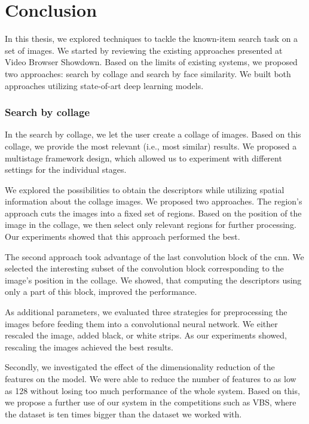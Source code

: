 \chapter*{Conclusion}

In this thesis, we explored techniques to tackle the known-item search task on a set of images. We started by reviewing the existing approaches presented at Video Browser Showdown. Based on the limits of existing systems, we proposed two approaches: search by collage and search by face similarity. We built both approaches utilizing state-of-art deep learning models. 

\subsection*{Search by collage}

In the search by collage, we let the user create a collage of images. Based on this collage, we provide the most relevant (i.e., most similar) results. We proposed a multistage framework design, which allowed us to experiment with different settings for the individual stages.

We explored the possibilities to obtain the descriptors while utilizing spatial information about the collage images. We proposed two approaches. The region's approach cuts the images into a fixed set of regions. Based on the position of the image in the collage, we then select only relevant regions for further processing. Our experiments showed that this approach performed the best. 

The second approach took advantage of the last convolution block of the \acrshort{cnn}. We selected the interesting subset of the convolution block corresponding to the image's position in the collage. We showed, that computing the descriptors using only a part of this block, improved the performance. 

As additional parameters, we evaluated three strategies for preprocessing the images before feeding them into a convolutional neural network. We either rescaled the image, added black, or white strips. As our experiments showed, rescaling the images achieved the best results.

Secondly, we investigated the effect of the dimensionality reduction of the features on the model. We were able to reduce the number of features to as low as 128 without losing too much performance of the whole system. Based on this, we propose a further use of our system in the competitions such as VBS, where the dataset is ten times bigger than the dataset we worked with.

